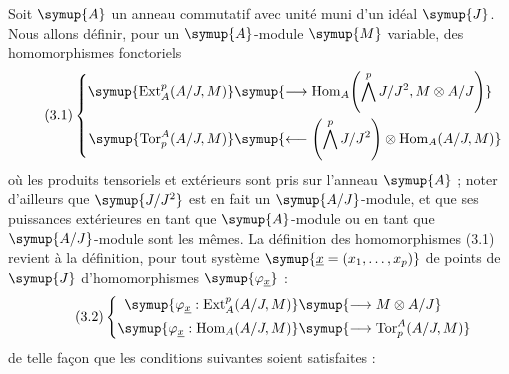 Soit $\symup{A}$ un anneau commutatif avec unité muni d'un idéal $\symup{J}$. Nous allons
définir, pour un $\symup{A}$-module $\symup{M}$ variable, des homomorphismes fonctoriels
\begin{equation}\tag{3.1}
\left\{
\begin{aligned}\symup{\operatorname{Ext}_{A}^{p}(A/J,M)}&\symup{\longrightarrow
  \operatorname{Hom}_{A}\!\left(\bigwedge^{p}J/J^{2},M\otimes A/J\right)}\\\symup{\operatorname{Tor}_{p}^{A}(A/J,M)}&\symup{\longleftarrow
  \left(\bigwedge^{p}J/J^{2}\right)
  \otimes\operatorname{Hom}_{A}(A/J,M)}\end{aligned}
\right.
\end{equation}
où les produits tensoriels et extérieurs sont pris sur l'anneau $\symup{A}$ ; noter
d'ailleurs que $\symup{J/J^{2}}$ est en fait un $\symup{A/J}$-module, et que ses puissances
extérieures en tant que $\symup{A}$-module ou en tant que $\symup{A/J}$-module sont les mêmes.
La définition des homomorphismes (3.1) revient à la définition, pour tout
système $\symup{\underline{x}=(x_1,\ldots,x_p)}$ de points de $\symup{J}$ d'homomorphismes
$\symup{\varphi_{\underline{x}}}$ :
\begin{equation}\tag{3.2}
\left\{
\begin{aligned}\symup{\varphi_{\underline{x}}:
  \operatorname{Ext}_{A}^{p}(A/J,M)}&\symup{\longrightarrow M\otimes A/J}\\\symup{\varphi_{\underline{x}}:
  \operatorname{Hom}_{A}(A/J,M)}&\symup{\longrightarrow
  \operatorname{Tor}_{p}^{A}(A/J,M)}\end{aligned}
\right.
\end{equation}
de telle façon que les conditions suivantes soient satisfaites :

